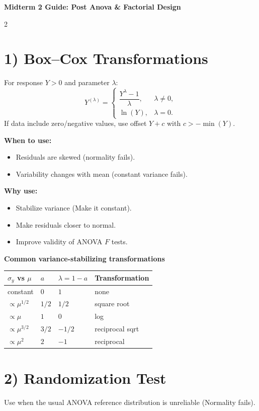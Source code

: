\documentclass[10pt, letterpaper]{article}
\begin{document}
\small

\begin{center}
    {\Large \textbf{Midterm 2 Guide: Post Anova \& Factorial Design}}
\end{center}
\begin{multicols}{2}

\section*{1) Box--Cox Transformations}
For response $Y>0$ and parameter $\lambda$:
\[
Y^{(\lambda)}=
\begin{cases}
\dfrac{Y^\lambda-1}{\lambda}, & \lambda\neq0,\\
\ln(Y), & \lambda=0.
\end{cases}
\]
If data include zero/negative values, use offset $Y+c$ with $c> -\min(Y)$.

\textbf{When to use:}
\begin{itemize}
  \item Residuals are skewed (normality fails).
  \item Variability changes with mean (constant variance fails).
\end{itemize}

\textbf{Why use:}
\begin{itemize}
  \item Stabilize variance (Make it constant).
  \item Make residuals closer to normal.
  \item Improve validity of ANOVA $F$ tests.
\end{itemize}

\textbf{Common variance-stabilizing transformations}
\begin{center}
\scriptsize
\begin{tabular}{llll}
\toprule
$\sigma_y$ vs $\mu$ & $a$ & $\lambda=1-a$ & Transformation \\
\midrule
constant & $0$ & $1$ & none \\
$\propto \mu^{1/2}$ & $1/2$ & $1/2$ & square root \\
$\propto \mu$ & $1$ & $0$ & log \\
$\propto \mu^{3/2}$ & $3/2$ & $-1/2$ & reciprocal sqrt \\
$\propto \mu^2$ & $2$ & $-1$ & reciprocal \\
\bottomrule
\end{tabular}
\end{center}

\section*{2) Randomization Test}
Use when the usual ANOVA reference distribution is unreliable (Normality fails).


\end{multicols}
\end{document}
